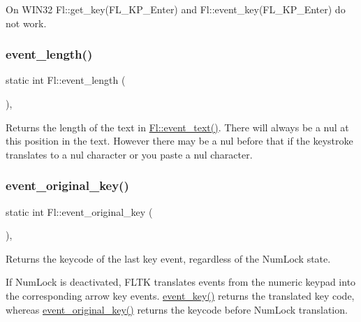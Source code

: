 On W\+I\+N32 Fl\+::get\+\_\+key(\+F\+L\+\_\+\+K\+P\+\_\+\+Enter) and Fl\+::event\+\_\+key(\+F\+L\+\_\+\+K\+P\+\_\+\+Enter) do not work. \mbox{\label{group__fl__events_ga38f2de89fbdf59ad2cd4dca93f472911}} 
\subsubsection{\texorpdfstring{event\+\_\+length()}{event\_length()}}
{\footnotesize\ttfamily static int Fl\+::event\+\_\+length (\begin{DoxyParamCaption}{ }\end{DoxyParamCaption})\hspace{0.3cm}{\ttfamily [inline]}, {\ttfamily [static]}}

Returns the length of the text in \hyperlink{group__fl__events_ga6647c55948fe1d8be9367267529e9c54}{Fl\+::event\+\_\+text()}. There will always be a nul at this position in the text. However there may be a nul before that if the keystroke translates to a nul character or you paste a nul character. \mbox{\label{group__fl__events_gadec41d640b647e422b88331015ab660d}} 
\subsubsection{\texorpdfstring{event\+\_\+original\+\_\+key()}{event\_original\_key()}}
{\footnotesize\ttfamily static int Fl\+::event\+\_\+original\+\_\+key (\begin{DoxyParamCaption}{ }\end{DoxyParamCaption})\hspace{0.3cm}{\ttfamily [inline]}, {\ttfamily [static]}}

Returns the keycode of the last key event, regardless of the Num\+Lock state.

If Num\+Lock is deactivated, F\+L\+TK translates events from the numeric keypad into the corresponding arrow key events. \hyperlink{group__fl__events_ga1ac131e3cd5ca674cc022b1f77233449}{event\+\_\+key()} returns the translated key code, whereas \hyperlink{group__fl__events_gadec41d640b647e422b88331015ab660d}{event\+\_\+original\+\_\+key()} returns the keycode before Num\+Lock translation. \mbox{\label{group__fl__events_gabd68dc8a592e9a2a41b42cb7e3a30060}} 
